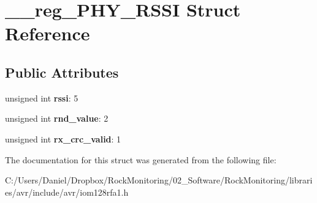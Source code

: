 \hypertarget{struct____reg___p_h_y___r_s_s_i}{}\section{\+\_\+\+\_\+reg\+\_\+\+P\+H\+Y\+\_\+\+R\+S\+SI Struct Reference}
\label{struct____reg___p_h_y___r_s_s_i}
\subsection*{Public Attributes}
\begin{DoxyCompactItemize}
\item 
unsigned int {\bfseries rssi}\+: 5\hypertarget{struct____reg___p_h_y___r_s_s_i_a15adbce778b71bd8c4ce55700b6d4d16}{}\label{struct____reg___p_h_y___r_s_s_i_a15adbce778b71bd8c4ce55700b6d4d16}

\item 
unsigned int {\bfseries rnd\+\_\+value}\+: 2\hypertarget{struct____reg___p_h_y___r_s_s_i_af1eff541825dd658972f594c03b8a205}{}\label{struct____reg___p_h_y___r_s_s_i_af1eff541825dd658972f594c03b8a205}

\item 
unsigned int {\bfseries rx\+\_\+crc\+\_\+valid}\+: 1\hypertarget{struct____reg___p_h_y___r_s_s_i_ad58ec6f063b49bf05756608567d908df}{}\label{struct____reg___p_h_y___r_s_s_i_ad58ec6f063b49bf05756608567d908df}

\end{DoxyCompactItemize}


The documentation for this struct was generated from the following file\+:\begin{DoxyCompactItemize}
\item 
C\+:/\+Users/\+Daniel/\+Dropbox/\+Rock\+Monitoring/02\+\_\+\+Software/\+Rock\+Monitoring/libraries/avr/include/avr/iom128rfa1.\+h\end{DoxyCompactItemize}
